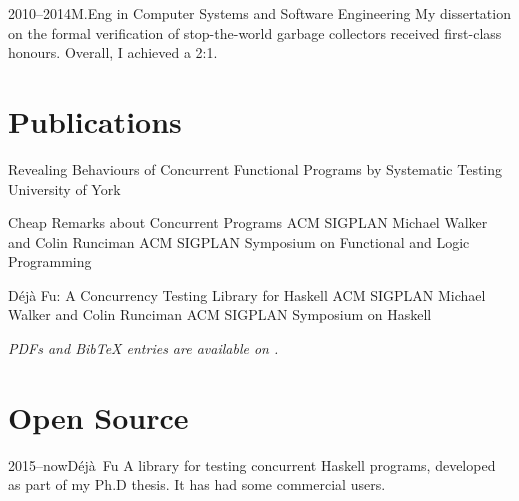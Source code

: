 \documentclass[a4paper]{barrucadu-cv}
\newcommand{\range}[2]{#1–#2}
\newcommand{\orange}[1]{\range{#1}{now}}
\begin{document}
\begin{cventry}{\range{2010}{2014}}{M.Eng in Computer Systems and Software Engineering}
  My dissertation on the formal verification of stop-the-world garbage
  collectors received first-class honours.  Overall, I achieved a 2:1.
\end{cventry}

\section{Publications}

\def\entryheadinglevel{subsection}

  {Revealing Behaviours of Concurrent Functional Programs by Systematic Testing}
  {University of York}

  {Cheap Remarks about Concurrent Programs}
  {ACM SIGPLAN}
  {Michael Walker and Colin Runciman}
  {ACM SIGPLAN Symposium on Functional and Logic Programming}

  {Déjà Fu: A Concurrency Testing Library for Haskell}
  {ACM SIGPLAN}
  {Michael Walker and Colin Runciman}
  {ACM SIGPLAN Symposium on Haskell}

\textit{PDFs and BibTeX entries are available on .}

\section{Open Source}

\begin{cventry}{\orange{2015}}{D\'{e}j\`{a}~Fu}
  A library for testing concurrent Haskell programs,
  developed as part of my Ph.D thesis. It has had some commercial users.

  \textbf{\small{}}
\end{cventry}
\end{document}
